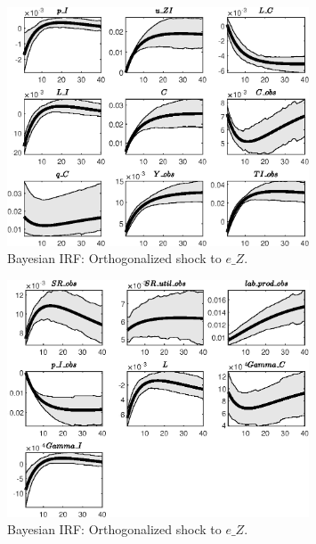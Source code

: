 \begin{figure}[H]
\centering 
\includegraphics[width=0.80\textwidth]{directed_search/Output/directed_search_Bayesian_IRF_e_Z_1}
\caption{Bayesian IRF: Orthogonalized shock to $e\_Z$.}
\label{Fig:BayesianIRF:e_Z:1}
\end{figure}
 
\begin{figure}[H]
\centering 
\includegraphics[width=0.80\textwidth]{directed_search/Output/directed_search_Bayesian_IRF_e_Z_2}
\caption{Bayesian IRF: Orthogonalized shock to $e\_Z$.}
\label{Fig:BayesianIRF:e_Z:2}
\end{figure}
 
